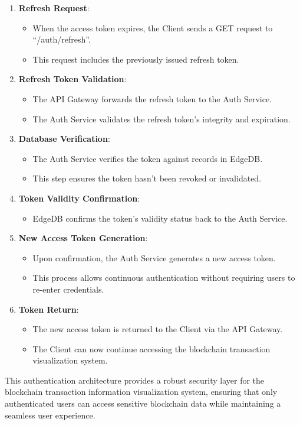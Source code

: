 \begin{enumerate}
    \item \textbf{Refresh Request}:
    \begin{itemize}
        \item When the access token expires, the Client sends a GET request to ``/auth/refresh''.
        \item This request includes the previously issued refresh token.
    \end{itemize}
    
    \item \textbf{Refresh Token Validation}:
    \begin{itemize}
        \item The API Gateway forwards the refresh token to the Auth Service.
        \item The Auth Service validates the refresh token's integrity and expiration.
    \end{itemize}
    
    \item \textbf{Database Verification}:
    \begin{itemize}
        \item The Auth Service verifies the token against records in EdgeDB.
        \item This step ensures the token hasn't been revoked or invalidated.
    \end{itemize}
    
    \item \textbf{Token Validity Confirmation}:
    \begin{itemize}
        \item EdgeDB confirms the token's validity status back to the Auth Service.
    \end{itemize}
    
    \item \textbf{New Access Token Generation}:
    \begin{itemize}
        \item Upon confirmation, the Auth Service generates a new access token.
        \item This process allows continuous authentication without requiring users to re-enter credentials.
    \end{itemize}
    
    \item \textbf{Token Return}:
    \begin{itemize}
        \item The new access token is returned to the Client via the API Gateway.
        \item The Client can now continue accessing the blockchain transaction visualization system.
    \end{itemize}
\end{enumerate}
This authentication architecture provides a robust security layer for the blockchain transaction information visualization system, ensuring that only authenticated users can access sensitive blockchain data while maintaining a seamless user experience.
